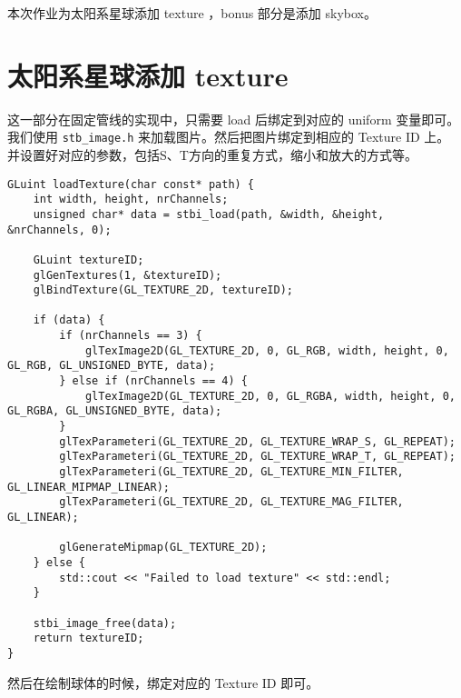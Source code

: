 \documentclass[12pt,hyperref,a4paper,UTF8]{ctexart}
\begin{document}
\cover


\thispagestyle{empty} %

\newpage
\tableofcontents

\newpage
本次作业为太阳系星球添加 texture ，bonus 部分是添加 skybox。

\section{太阳系星球添加 texture}

这一部分在固定管线的实现中，只需要 load 后绑定到对应的 uniform 变量即可。我们使用 \texttt{stb\_image.h} 来加载图片。然后把图片绑定到相应的 Texture ID 上。
并设置好对应的参数，包括S、T方向的重复方式，缩小和放大的方式等。

\begin{verbatim}
GLuint loadTexture(char const* path) {
    int width, height, nrChannels;
    unsigned char* data = stbi_load(path, &width, &height, &nrChannels, 0);

    GLuint textureID;
    glGenTextures(1, &textureID);
    glBindTexture(GL_TEXTURE_2D, textureID);

    if (data) {
        if (nrChannels == 3) {
            glTexImage2D(GL_TEXTURE_2D, 0, GL_RGB, width, height, 0, GL_RGB, GL_UNSIGNED_BYTE, data);
        } else if (nrChannels == 4) {
            glTexImage2D(GL_TEXTURE_2D, 0, GL_RGBA, width, height, 0, GL_RGBA, GL_UNSIGNED_BYTE, data);
        }
        glTexParameteri(GL_TEXTURE_2D, GL_TEXTURE_WRAP_S, GL_REPEAT);   
        glTexParameteri(GL_TEXTURE_2D, GL_TEXTURE_WRAP_T, GL_REPEAT);
        glTexParameteri(GL_TEXTURE_2D, GL_TEXTURE_MIN_FILTER, GL_LINEAR_MIPMAP_LINEAR);
        glTexParameteri(GL_TEXTURE_2D, GL_TEXTURE_MAG_FILTER, GL_LINEAR);

        glGenerateMipmap(GL_TEXTURE_2D);
    } else {
        std::cout << "Failed to load texture" << std::endl;
    }

    stbi_image_free(data);
    return textureID;  
}
\end{verbatim}

然后在绘制球体的时候，绑定对应的 Texture ID 即可。
\end{document}
